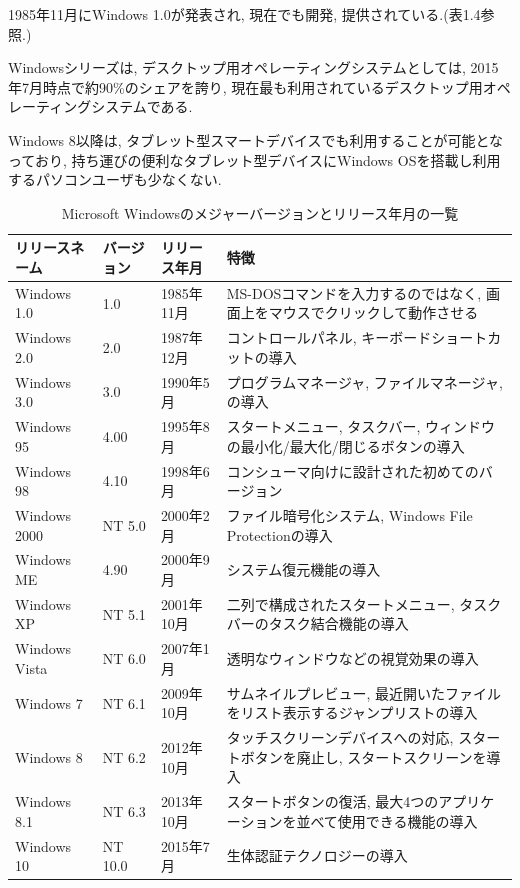 1985年11月にWindows 1.0が発表され, 現在でも開発, 提供されている.(表1.4参照.)

Windowsシリーズは, デスクトップ用オペレーティングシステムとしては, 2015年7月時点で約90\%のシェアを誇り, 現在最も利用されているデスクトップ用オペレーティングシステムである.

Windows 8以降は, タブレット型スマートデバイスでも利用することが可能となっており, 持ち運びの便利なタブレット型デバイスにWindows OSを搭載し利用するパソコンユーザも少なくない.

\begin{table}[htb]
\begin{center}
\begin{tabular}{|l|l|l|p{5.5cm}|} \hline
リリースネーム & バージョン & リリース年月 & 特徴 \\ \hline \hline
Windows 1.0 & 1.0 & 1985年11月 & MS-DOSコマンドを入力するのではなく, 画面上をマウスでクリックして動作させる \\ \hline
Windows 2.0 & 2.0 & 1987年12月 & コントロールパネル, キーボードショートカットの導入 \\ \hline
Windows 3.0 & 3.0 & 1990年5月 & プログラムマネージャ, ファイルマネージャ,の導入 \\ \hline
Windows 95 & 4.00 & 1995年8月 & スタートメニュー, タスクバー, ウィンドウの最小化/最大化/閉じるボタンの導入 \\ \hline
Windows 98 & 4.10 & 1998年6月 & コンシューマ向けに設計された初めてのバージョン \\ \hline
Windows 2000 & NT 5.0 & 2000年2月 & ファイル暗号化システム, Windows File Protectionの導入 \\ \hline
Windows ME & 4.90 & 2000年9月 & システム復元機能の導入 \\ \hline
Windows XP & NT 5.1 & 2001年10月 & 二列で構成されたスタートメニュー, タスクバーのタスク結合機能の導入 \\ \hline
Windows Vista & NT 6.0 & 2007年1月 & 透明なウィンドウなどの視覚効果の導入 \\ \hline
Windows 7 & NT 6.1 & 2009年10月 & サムネイルプレビュー, 最近開いたファイルをリスト表示するジャンプリストの導入 \\ \hline
Windows 8 & NT 6.2 & 2012年10月 & タッチスクリーンデバイスへの対応, スタートボタンを廃止し, スタートスクリーンを導入 \\ \hline
Windows 8.1 & NT 6.3 & 2013年10月 & スタートボタンの復活, 最大4つのアプリケーションを並べて使用できる機能の導入 \\ \hline
Windows 10 & NT 10.0 & 2015年7月 & 生体認証テクノロジーの導入 \\ \hline
\end{tabular}
\caption{Microsoft Windowsのメジャーバージョンとリリース年月の一覧}
\end{center}
\end{table}

